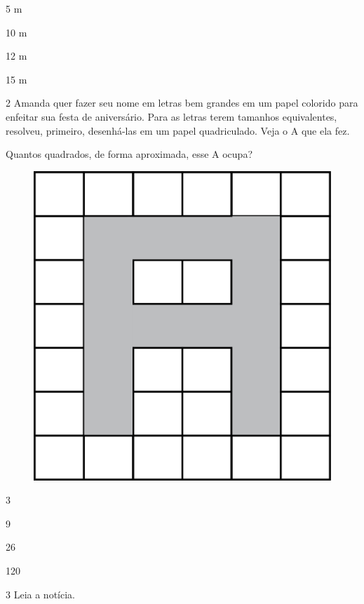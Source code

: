 \begin{escolha}
\item
  5 m
\item
  10 m
\item
  12 m
\item
  15 m
\end{escolha}

\pagebreak

\num{2} Amanda quer fazer seu nome em letras bem grandes em um papel colorido para enfeitar sua festa de aniversário. Para as letras terem tamanhos equivalentes, resolveu, primeiro, desenhá-las em um papel quadriculado. Veja o A que ela fez.

Quantos quadrados, de forma aproximada, esse A ocupa?

\begin{figure}[htpb!]
\centering
\includegraphics[width=.8\textwidth]{./media/image62.png}
\end{figure}

\begin{escolha}
\item
  3
\item
  9
\item
  26
\item
  120
\end{escolha}

\pagebreak
\num{3} Leia a notícia.

